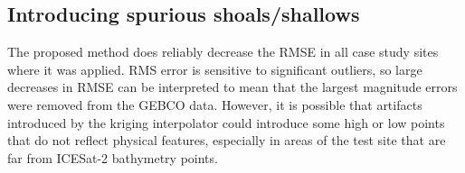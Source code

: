 \subsection{Introducing spurious shoals/shallows}

The proposed method does reliably decrease the RMSE in all case study sites where it was applied. RMS error is sensitive to significant outliers, so large decreases in RMSE can be interpreted to mean that the largest magnitude errors were removed from the GEBCO data. However, it is possible that artifacts introduced by the kriging interpolator could introduce some high or low points that do not reflect physical features, especially in areas of the test site that are far from ICESat-2 bathymetry points.